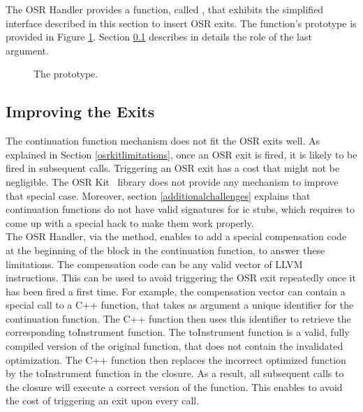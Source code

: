 The OSR Handler provides a function, called , that exhibits the simplified interface described in this section to insert OSR exits.
The function's prototype is provided in Figure \ref{fig:insertoserexit}.
Section \ref{improvingexits} describes in details the role of the last argument.\\

\begin{figure}[h]
\caption{The  prototype.}
\label{fig:insertoserexit}
\end{figure}

\subsection{Improving the Exits}\label{improvingexits}

The continuation function mechanism does not fit the OSR exits well.
As explained in Section \ref{osrkitlimitations}, once an OSR exit is fired, it is likely to be fired in subsequent calls.
Triggering an OSR exit has a cost that might not be negligible.
The OSR Kit~\cite{OSRKit} library does not provide any mechanism to improve that special case.
Moreover, section \ref{additionalchallenges} explains that continuation functions do not have valid signatures for ic stubs, which requires to come up with a special hack to make them work properly.\\

The OSR Handler, via the  method, enables to add a special compensation code at the beginning of the  block in the continuation function, to answer these limitations.
The compensation code can be any valid vector of LLVM instructions.
This can be used to avoid triggering the OSR exit repeatedly once it has been fired a first time.
For example, the compensation vector can contain a special call to a C++ function, that takes as argument a unique identifier for the continuation function. 
The C++ function then uses this identifier to retrieve the corresponding toInstrument function.
The toInstrument function is a valid, fully compiled version of the original function, that does not contain the invalidated optimization.
The C++ function then replaces the incorrect optimized function by the toInstrument function in the closure.
As a result, all subsequent calls to the closure will execute a correct version of the function.
This enables to avoid the cost of triggering an exit upon every call.\\

